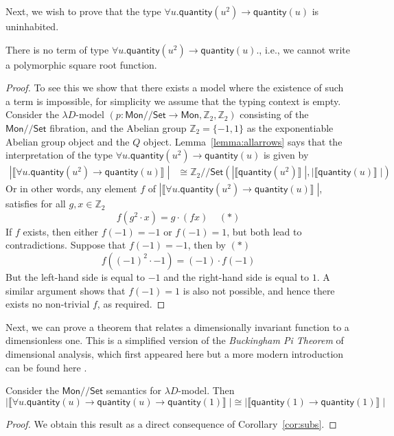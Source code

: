 \documentclass[a4paper,UKenglish]{lipics}
\newcommand{\msf}[1]{\mathsf{#1}} %
\newcommand{\Mon}{\msf{Mon}}
\newcommand{\Set}{\msf{Set}}
\newcommand{\GroupSet}[1]{#1/\!/\Set}
\newcommand{\MonSet}{\GroupSet{\Mon}}
\newcommand{\bbZ}{\mathbb{Z}}
\newcommand{\sem}[1]{\ensuremath{\llbracket #1 \rrbracket} \;}
\newcommand{\qnt}{\msf{quantity}}
\begin{document}
Next, we wish to prove that the type  $\forall u . \qnt(u^2) \rightarrow \qnt(u)$ is uninhabited.

\begin{theorem}
\label{thm:UninhabType}
 There is no term of type $\forall u . \qnt(u^2) \rightarrow \qnt(u)$., i.e., we cannot write a polymorphic square root function.
\end{theorem}
\begin{proof}
To see this we show that there exists a model where the existence of such a term is impossible, for simplicity we assume that the typing context is empty. Consider the $\lambda D$-model $(p:\MonSet \rightarrow \Mon, \mathbb{Z}_2, \mathbb{Z}_2)$  consisting of the $\MonSet$ fibration, and the Abelian group $\mathbb{Z}_2 = \{ -1, 1\}$ as the exponentiable Abelian group object and the $Q$ object. Lemma~\ref{lemma:allarrows} says that the interpretation of the type $\forall u . \qnt(u^2) \rightarrow \qnt(u)$ is given by
\begin{align*}
  |\sem{\forall u . \qnt(u^2) \rightarrow \qnt(u)}|  &  \cong \GroupSet{\mathbb{Z}_2} (|\sem{\qnt (u^2)}|, |\sem{\qnt(u)}|)
\end{align*}
Or in other words, any element $f$ of $ |\sem{\forall u . \qnt(u^2) \rightarrow \qnt(u)}|$, satisfies for all $g, x \in \bbZ_2$
\[
f (g^2 \cdot x) = g \cdot (fx) \; \; \; \; (\ast)
\]
If $f$ exists, then either $f(-1) = -1$ or $f(-1) = 1$, but both lead to contradictions. Suppose that $f(-1) = -1$, then by $(\ast)$
\[
 f((-1)^2 \cdot -1) = (-1) \cdot f(-1)
\]
But the left-hand side is equal to $-1$ and the right-hand side is equal to $1$. A similar argument shows that $f(-1)=1$ is also not possible, and hence there exists no non-trivial $f$, as required.
\end{proof}

Next, we can prove a theorem that relates a dimensionally invariant function to a dimensionless one. This is a simplified version of the \emph{Buckingham Pi Theorem} of dimensional analysis, which first appeared here \cite{buckingham1914physically} but a more modern introduction can be found here \cite{sonin2001physical}.

\begin{theorem}
 \label{lem:AppSubs}
Consider the $\MonSet$ semantics for $\lambda D$-model. Then
\[
 |\sem{\forall u . \qnt(u) \rightarrow \qnt(u) \rightarrow \qnt(1)}| \cong |\sem{\qnt(1)\rightarrow \qnt(1)}|
\]
\end{theorem}
\begin{proof}
We obtain this result as a direct consequence of Corollary~\ref{cor:subs}.
\end{proof}
\end{document}
